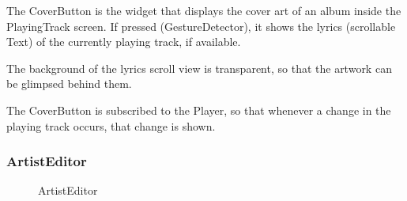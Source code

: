 \documentclass{article}
\begin{document}
The CoverButton is the widget that displays the cover art of an album inside the
PlayingTrack screen. If pressed (GestureDetector), it shows the lyrics
(scrollable Text) of the currently playing track, if available.

The background of the lyrics scroll view is transparent, so that the artwork can
be glimpsed behind them.

The CoverButton is subscribed to the Player, so that whenever a change in the
playing track occurs, that change is shown.

\subsubsection{ArtistEditor}

\begin{figure}[H]
	\noindent
	\caption{ArtistEditor} 
\end{figure}
\end{document}
